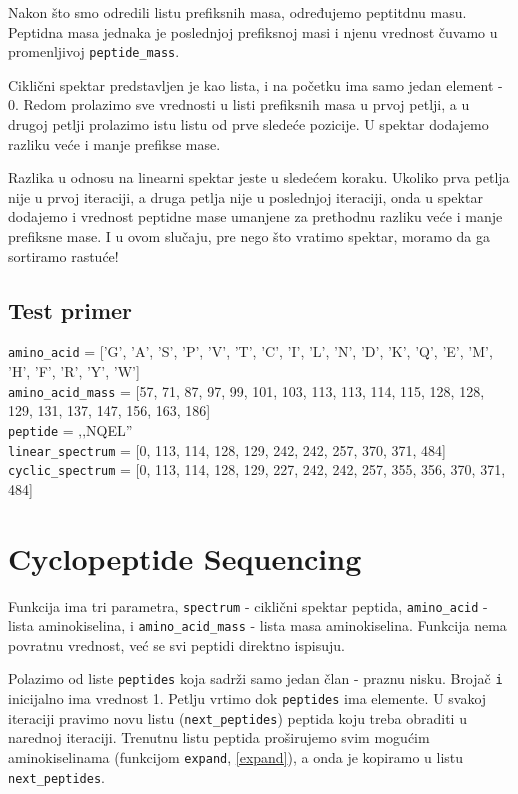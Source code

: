 Nakon što smo odredili listu prefiksnih masa, određujemo peptitdnu masu. Peptidna masa jednaka je poslednjoj prefiksnoj masi i njenu vrednost čuvamo u promenljivoj \texttt{peptide\_mass}.

Ciklični spektar predstavljen je kao lista, i na početku ima samo jedan element - 0. Redom prolazimo sve vrednosti u listi prefiksnih masa u prvoj petlji, a u drugoj petlji prolazimo istu listu od prve sledeće pozicije. U spektar dodajemo razliku veće i manje prefikse mase. 

Razlika u odnosu na linearni spektar jeste u sledećem koraku. Ukoliko prva petlja nije u prvoj iteraciji, a druga petlja nije u poslednjoj iteraciji, onda u spektar dodajemo i vrednost peptidne mase umanjene za prethodnu razliku veće i manje prefiksne mase. I u ovom slučaju, pre nego što vratimo spektar, moramo da ga sortiramo rastuće!




\subsection{Test primer}

\noindent\texttt{amino\_acid} = ['G', 'A', 'S', 'P', 'V', 'T', 'C', 'I', 'L', 'N', 'D', 'K', 'Q', 'E', 'M', 'H', 'F', 'R', 'Y', 'W']
\\
\texttt{amino\_acid\_mass} = [57, 71, 87, 97, 99, 101, 103, 113, 113, 114, 115, 128, 128, 129, 131, 137, 147, 156, 163, 186]
\\
\texttt{peptide} = ‚‚NQEL''
\\\texttt{linear\_spectrum} = [0, 113, 114, 128, 129, 242, 242, 257, 370, 371, 484]
\\\texttt{cyclic\_spectrum} = [0, 113, 114, 128, 129, 227, 242, 242, 257, 355, 356, 370, 371, 484]


\section{Cyclopeptide Sequencing}

Funkcija ima tri parametra, \texttt{spectrum} - ciklični spektar peptida, \texttt{amino\_acid} - lista aminokiselina, i \texttt{amino\_acid\_mass} - lista masa aminokiselina. Funkcija nema povratnu vrednost, već se svi peptidi direktno ispisuju.

Polazimo od liste \texttt{peptides} koja sadrži samo jedan član - praznu nisku. Brojač \texttt{i} inicijalno ima vrednost 1. Petlju vrtimo dok \texttt{peptides} ima elemente. U svakoj iteraciji pravimo novu listu (\texttt{next\_peptides}) peptida koju treba obraditi u narednoj iteraciji. Trenutnu listu peptida proširujemo svim mogućim aminokiselinama (funkcijom \texttt{expand}, \ref{expand}), a onda je kopiramo u listu \texttt{next\_peptides}. 

